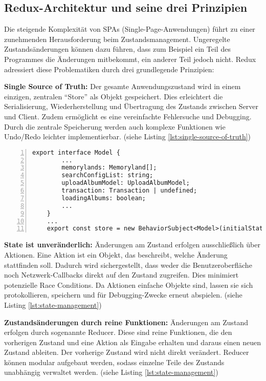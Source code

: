 \subsection{Redux-Architektur und seine drei Prinzipien}

Die steigende Komplexität von SPAs (Single-Page-Anwendungen) führt zu einer zunehmenden Herausforderung 
beim Zustandsmanagement. Ungeregelte Zustandsänderungen können dazu führen, dass zum Beispiel ein Teil
des Programmes die Änderungen mitbekommt, ein anderer Teil jedoch nicht. Redux adressiert diese Problematiken 
durch drei grundlegende Prinzipien:

\textbf{Single Source of Truth:} Der gesamte Anwendungszustand wird in einem einzigen, zentralen ``Store'' als 
Objekt gespeichert. Dies erleichtert die Serialisierung, Wiederherstellung und Übertragung des Zustands zwischen 
Server und Client. Zudem ermöglicht es eine vereinfachte Fehlersuche und Debugging. Durch die zentrale Speicherung 
werden auch komplexe Funktionen wie Undo/Redo leichter implementierbar. (siehe Listing \ref{lst:single-source-of-truth})

\begin{lstlisting}[numbers=left,caption={Single Source of Truth Implementierung in Memoryland},label={lst:single-source-of-truth}]
    export interface Model {
        ...
        memorylands: Memoryland[];
        searchConfigList: string;
        uploadAlbumModel: UploadAlbumModel;
        transaction: Transaction | undefined;
        loadingAlbums: boolean;
        ...
    }
    ...
    export const store = new BehaviorSubject<Model>(initialState);
\end{lstlisting}

\textbf{State ist unveränderlich:} Änderungen am Zustand erfolgen ausschließlich über Aktionen. Eine Aktion 
ist ein Objekt, das beschreibt, welche Änderung stattfinden soll. Dadurch wird sichergestellt, dass weder die 
Benutzeroberfläche noch Netzwerk-Callbacks direkt auf den Zustand zugreifen. Dies minimiert potenzielle Race 
Conditions. Da Aktionen einfache Objekte sind, lassen sie sich protokollieren, speichern und für Debugging-Zwecke 
erneut abspielen. (siehe Listing \ref{lst:state-management})

\textbf{Zustandsänderungen durch reine Funktionen:} Änderungen am Zustand erfolgen durch sogenannte Reducer. 
Diese sind reine Funktionen, die den vorherigen Zustand und eine Aktion als Eingabe erhalten und daraus einen 
neuen Zustand ableiten. Der vorherige Zustand wird nicht direkt verändert. Reducer können modular aufgebaut 
werden, sodass einzelne Teile des Zustands unabhängig verwaltet werden. (siehe Listing \ref{lst:state-management})

